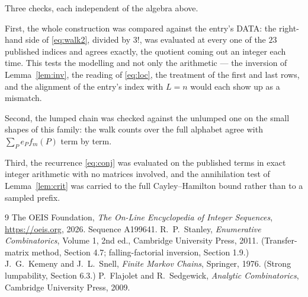 \documentclass[11pt,a4paper]{article}
\theoremstyle{plain}
\theoremstyle{definition}
\begin{document}
Three checks, each independent of the algebra above.

First, the whole construction was compared against the entry's DATA: the right-hand side of
\eqref{eq:walk2}, divided by $3!$, was evaluated at every one of the $23$
published indices and agrees exactly, the quotient coming out an integer each time. This
tests the modelling and not only the arithmetic --- the inversion of Lemma~\ref{lem:inv},
the reading of \eqref{eq:loc}, the treatment of the first and last rows, and the
alignment of the entry's index with $L=n$ would each show up as a mismatch.

Second, the lumped chain was checked against the unlumped one on the small shapes of this
family: the walk counts over the full alphabet agree with $\sum_P e_Pf_m(P)$ term by term.

Third, the recurrence \eqref{eq:conj} was evaluated on the published terms in exact integer
arithmetic with no matrices involved, and the annihilation test of Lemma~\ref{lem:crit} was
carried to the full Cayley--Hamilton bound rather than to a sampled prefix.

\begin{thebibliography}{9}
 The OEIS Foundation, \emph{The On-Line Encyclopedia of Integer
Sequences}, \url{https://oeis.org}, 2026. Sequence A199641.
 R.~P.~Stanley, \emph{Enumerative Combinatorics}, Volume 1, 2nd ed.,
Cambridge University Press, 2011. (Transfer-matrix method, Section 4.7; falling-factorial
inversion, Section 1.9.)
 J.~G.~Kemeny and J.~L.~Snell, \emph{Finite Markov Chains}, Springer,
1976. (Strong lumpability, Section 6.3.)
 P.~Flajolet and R.~Sedgewick, \emph{Analytic Combinatorics}, Cambridge
University Press, 2009.
\end{thebibliography}
\end{document}
